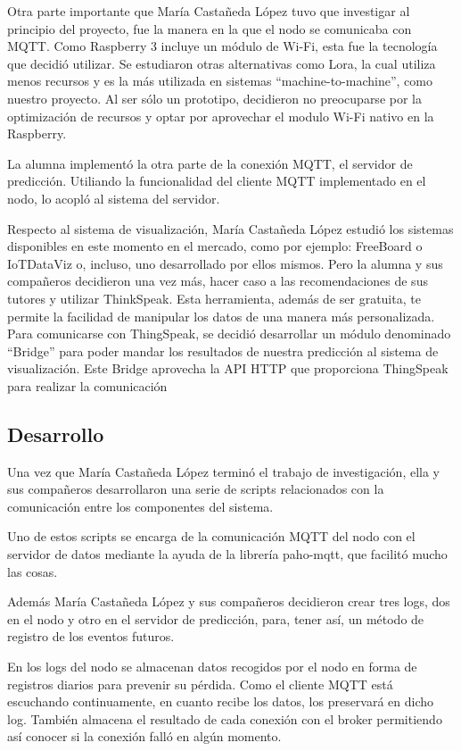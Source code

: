 Otra parte importante que María Castañeda López tuvo que investigar al principio del proyecto, fue la manera en la que el nodo se comunicaba con MQTT. Como Raspberry 3 incluye un módulo de Wi-Fi, esta fue la tecnología que decidió utilizar. Se estudiaron otras alternativas como Lora, la cual utiliza menos recursos y es la más utilizada en sistemas ``machine-to-machine'', como nuestro proyecto. Al ser sólo un prototipo, decidieron no preocuparse por la optimización de recursos y optar por aprovechar el modulo Wi-Fi nativo en la Raspberry.

La alumna implementó la otra parte de la conexión MQTT, el servidor de predicción. Utiliando la funcionalidad del cliente MQTT implementado en el nodo, lo acopló al sistema del servidor.

Respecto al sistema de visualización, María Castañeda López estudió los sistemas disponibles en este momento en el mercado, como por ejemplo: FreeBoard o IoTDataViz o, incluso, uno desarrollado por ellos mismos. Pero la alumna y sus compañeros decidieron una vez más, hacer caso a las recomendaciones de sus tutores y utilizar ThinkSpeak. Esta herramienta, además de ser gratuita, te permite la facilidad de manipular los datos de una manera más personalizada. Para comunicarse con ThingSpeak, se decidió desarrollar un módulo denominado ``Bridge'' para poder mandar los resultados de nuestra predicción al sistema de visualización. Este Bridge aprovecha la API HTTP que proporciona ThingSpeak para realizar la comunicación

\subsection{Desarrollo}
Una vez que María Castañeda López terminó el trabajo de investigación, ella y sus compañeros desarrollaron una serie de scripts relacionados con la comunicación entre los componentes del sistema.

Uno de estos scripts se encarga de la comunicación MQTT del nodo con el servidor de datos mediante la ayuda de la librería paho-mqtt, que facilitó mucho las cosas.

Además María Castañeda López y sus compañeros decidieron crear tres logs, dos en el nodo y otro en el servidor de predicción, para, tener así, un método de registro de los eventos futuros.

En los logs del nodo se almacenan datos recogidos por el nodo en forma de registros diarios para prevenir su pérdida. Como el cliente MQTT está escuchando continuamente, en cuanto recibe los datos, los preservará en dicho log. También almacena el resultado de cada conexión con el broker permitiendo así conocer si la conexión falló en algún momento.

